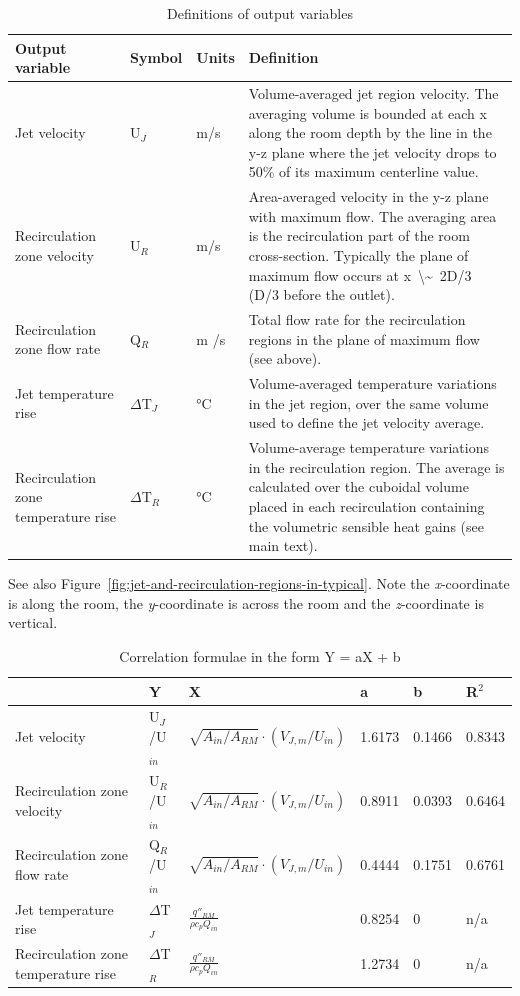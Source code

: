 \begin{longtable}[c]{p{1.25in}p{0.5in}p{0.5in}p{3.0in}}
\caption{Definitions of output variables \protect \label{table:definitions-of-output-variables}}\\
\toprule 
Output variable & Symbol & Units & Definition \tabularnewline \midrule
\endhead
Jet velocity & U\(_J\) & m/s & Volume-averaged jet region velocity. The averaging volume is bounded at each x along the room depth by the line in the y-z plane where the jet velocity drops to 50\% of its maximum centerline value. \tabularnewline
Recirculation zone velocity & U\(_R\) & m/s & Area-averaged velocity in the y-z plane with maximum flow. The averaging area is the recirculation part of the room cross-section. Typically the plane of maximum flow occurs at x~\textbackslash\~{}~2D/3 (D/3 before the outlet). \tabularnewline
Recirculation zone flow rate & Q\(_R\) & m  /s & Total flow rate for the recirculation regions in the plane of maximum flow (see above). \tabularnewline
Jet temperature rise & $\Delta$T\(_J\) & °C & Volume-averaged temperature variations in the jet region, over the same volume used to define the jet velocity average. \tabularnewline
Recirculation zone temperature rise & $\Delta$T\(_R\) & °C & Volume-average temperature variations in the recirculation region. The average is calculated over the cuboidal volume placed in each recirculation containing the volumetric sensible heat gains (see main text). \tabularnewline
\bottomrule
\end{longtable}

See also Figure~\ref{fig:jet-and-recirculation-regions-in-typical}. Note the \emph{x}-coordinate is along the room, the \emph{y}-coordinate is across the room and the \emph{z}-coordinate is vertical.

\begin{longtable}[c]{p{1.0in}p{0.5in}p{2.0in}p{0.5in}p{0.5in}p{0.5in}}
\caption{Correlation formulae in the form Y = aX + b \protect \label{table:correlation-formulae-in-the-form-y-ax-+-b}}\\
\toprule 
~ & Y & X & a & b & R\(^2\) \tabularnewline \midrule
\endhead
Jet velocity & U\(_J\)/U\(_{in}\) & $\sqrt{A_{in}/A_{RM}} \cdot \left(V_{J,m}/U_{in}\right)$ & 1.6173 & 0.1466 & 0.8343 \tabularnewline
Recirculation zone velocity & U\(_R\)/U\(_{in}\) & $\sqrt{A_{in}/A_{RM}} \cdot \left(V_{J,m}/U_{in}\right)$ & 0.8911 & 0.0393 & 0.6464 \tabularnewline
Recirculation zone flow rate & Q\(_R\)/U\(_{in}\) & $\sqrt{A_{in}/A_{RM}} \cdot \left(V_{J,m}/U_{in}\right)$ & 0.4444 & 0.1751 & 0.6761 \tabularnewline
Jet temperature rise & $\Delta$T\(_J\) & $\frac{q''_{RM}}{\rho {c_p}{Q_{in}}}$ & 0.8254 & 0 & n/a \tabularnewline
Recirculation zone temperature rise & $\Delta$T\(_R\) & $\frac{q''_{RM}}{\rho {c_p}{Q_{in}}}$ & 1.2734 & 0 & n/a \tabularnewline
\bottomrule
\end{longtable}


